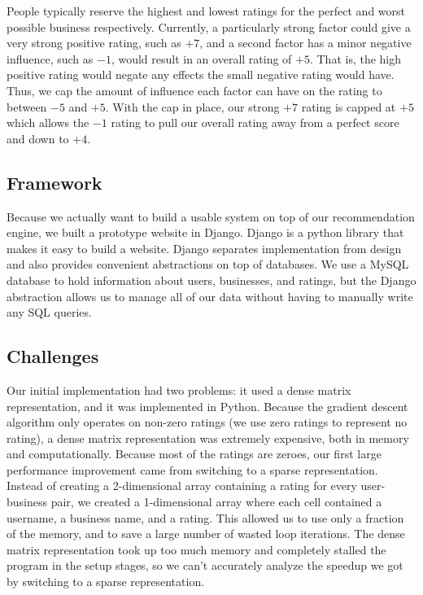 People typically reserve the highest and lowest ratings for the perfect and
worst possible business respectively. Currently, a particularly strong factor
could give a very strong positive rating, such as $+7$, and a second factor has
a minor negative influence, such as $-1$, would result in an overall rating of
$+5$. That is, the high positive rating would negate any effects the small
negative rating would have. Thus, we cap the amount of influence each factor
can have on the rating to between $-5$ and $+5$. With the cap in place, our
strong $+7$ rating is capped at $+5$ which allows the $-1$ rating to pull our
overall rating away from a perfect score and down to $+4$. \cite{funk}

\subsection{Framework}

Because we actually want to build a usable system on top of our recommendation
engine, we built a prototype website in Django. Django is a python library that
makes it easy to build a website. Django separates implementation from design
and also provides convenient abstractions on top of databases. We use a MySQL
database to hold information about users, businesses, and ratings, but the
Django abstraction allows us to manage all of our data without having to
manually write any SQL queries.

\subsection{Challenges}

Our initial implementation had two problems: it used a dense matrix
representation, and it was implemented in Python. Because the gradient descent
algorithm only operates on non-zero ratings (we use zero ratings to represent
no rating), a dense matrix representation was extremely expensive, both in
memory and computationally. Because most of the ratings are zeroes, our first
large performance improvement came from switching to a sparse representation.
Instead of creating a 2-dimensional array containing a rating for every
user-business pair, we created a 1-dimensional array where each cell contained a
username, a business name, and a rating. This allowed us to use only a fraction
of the memory, and to save a large number of wasted loop iterations. The dense
matrix representation took up too much memory and completely stalled the program
in the setup stages, so we can't accurately analyze the speedup we got by
switching to a sparse representation.

